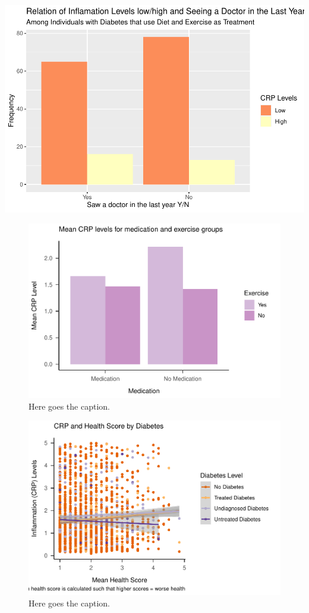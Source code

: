 \documentclass[
  man]{apa6}
\begin{document}
\includegraphics{NEW_Final_Groupof5_files/figure-latex/prop-access-bar-1.pdf}


\begin{figure}
\centering
\includegraphics{NEW_Final_Groupof5_files/figure-latex/tableofcrpmedicationandexercise-1.pdf}
\caption{\label{fig:tableofcrpmedicationandexercise}Here goes the caption.}
\end{figure}

\begin{figure}
\centering
\includegraphics{NEW_Final_Groupof5_files/figure-latex/appendix-fig1-1.pdf}
\caption{\label{fig:appendix-fig1}Here goes the caption.}
\end{figure}
\end{document}
